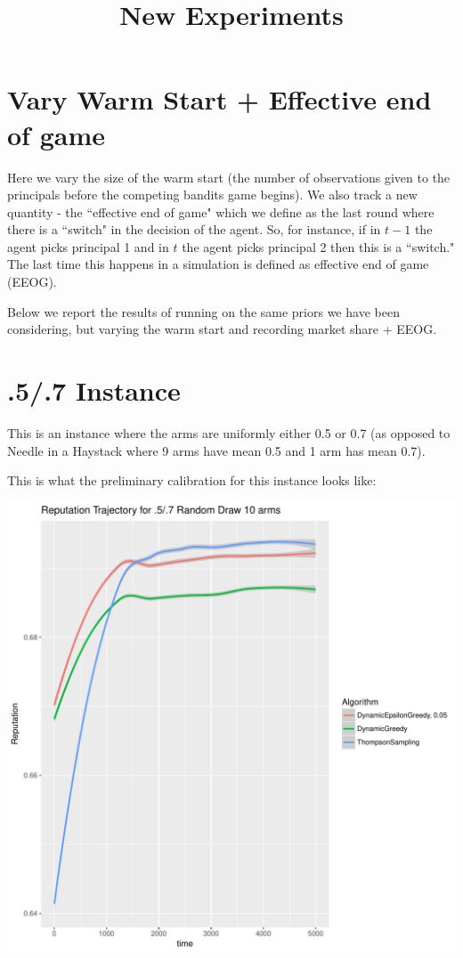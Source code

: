 \documentclass[11pt,letterpaper]{article}
\begin{document}
 

\title{New Experiments}
\maketitle

\section*{Vary Warm Start + Effective end of game}

Here we vary the size of the warm start (the number of observations given to the principals before the competing bandits game begins). We also track a new quantity - the ``effective end of game" which we define as the last round where there is a ``switch" in the decision of the agent. So, for instance, if in $t-1$ the agent picks principal 1 and in $t$ the agent picks principal 2 then this is a ``switch." The last time this happens in a simulation is defined as effective end of game (EEOG).

Below we report the results of running on the same priors we have been considering, but varying the warm start and recording market share + EEOG.


\section*{.5/.7 Instance}

This is an instance where the arms are uniformly either 0.5 or 0.7 (as opposed to Needle in a Haystack where 9 arms have mean 0.5 and 1 arm has mean 0.7).

This is what the preliminary calibration for this instance looks like:

\includegraphics[scale=0.5]{"Reputation Trajectory for 5_7"}
\end{document}
